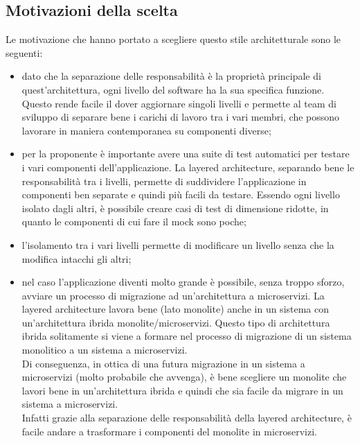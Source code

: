 \subsection{Motivazioni della scelta}
Le motivazione che hanno portato a scegliere questo stile architetturale sono le seguenti:
\begin{itemize}
    \item dato che la separazione delle responsabilità è la proprietà principale di quest'architettura,
        ogni livello del software ha la sua specifica funzione. Questo rende facile il dover aggiornare 
        singoli livelli e permette al team di sviluppo di separare bene i carichi di lavoro tra i vari 
        membri, che possono lavorare in maniera contemporanea su componenti diverse;
    \item per la proponente è importante avere una suite di test automatici per testare i vari componenti
        dell'applicazione. La layered architecture, separando bene le responsabilità tra i livelli, 
        permette di suddividere l'applicazione in componenti ben separate e quindi più facili da testare.
        Essendo ogni livello isolato dagli altri, è possibile creare casi di test di dimensione ridotte, 
        in quanto le componenti di cui fare il \gls{mock} sono poche;
    \item l'isolamento tra i vari livelli permette di modificare un livello senza che la modifica intacchi
        gli altri;
    \item nel caso l'applicazione diventi molto grande è possibile, senza troppo sforzo, avviare un processo
        di migrazione ad un'architettura a microservizi. La layered architecture lavora bene (lato monolite) anche
        in un sistema con un'architettura ibrida monolite/microservizi. Questo tipo di architettura
        ibrida solitamente si viene a formare nel processo di migrazione di un sistema monolitico a un sistema a microservizi.
        \\
        Di conseguenza, in ottica di una futura migrazione in un sistema a microservizi (molto probabile che avvenga), è
        bene scegliere un monolite che lavori bene in un'architettura ibrida e quindi che sia facile da migrare
        in un sistema a microservizi.
        \\
        Infatti grazie alla separazione delle responsabilità della layered architecture, è facile andare
        a trasformare i componenti del monolite in microservizi.
\end{itemize}
\clearpage
